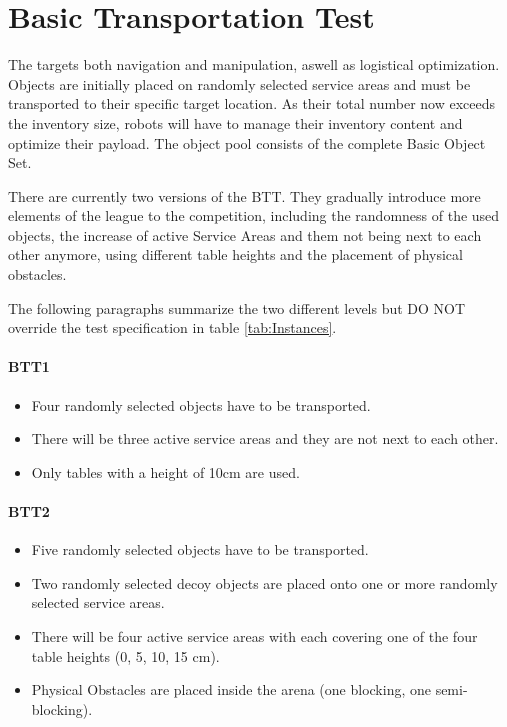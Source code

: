 
\section{Basic Transportation Test}
\label{sec:Basic Transportation Test}

The  targets both navigation and manipulation, aswell as logistical optimization. Objects are initially placed on randomly selected service areas and must be transported to their specific target location.
As their total number now exceeds the inventory size, robots will have to manage their inventory content and optimize their payload. The object pool consists of the complete Basic Object Set.

There are currently two versions of the BTT. 
They gradually introduce more elements of the league to the competition, including the randomness of the used objects, the increase of active Service Areas and them not being next to each other anymore, using different table heights and the placement of physical obstacles.

The following paragraphs summarize the two different levels but DO NOT override the test specification in table \ref{tab:Instances}.

\paragraph{BTT1}
\begin{itemize}
\item Four randomly selected objects have to be transported.
\item There will be three active service areas and they are not next to each other.
\item Only tables with a height of 10cm are used. 
\end{itemize}

\paragraph{BTT2}
\begin{itemize}
\item Five randomly selected objects have to be transported.
\item Two randomly selected decoy objects are placed onto one or more randomly selected service areas.
\item There will be four active service areas with each covering one of the four table heights (0, 5, 10, 15 $\si{\centi\meter}$).
\item Physical Obstacles are placed inside the arena (one blocking, one semi-blocking).
\end{itemize}